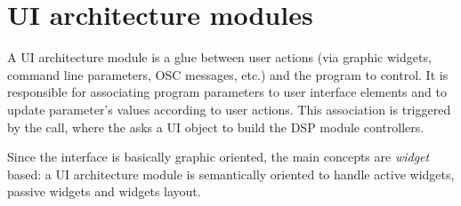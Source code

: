 % 


\section{UI architecture modules} \label{sec:gui}

A UI architecture module is a glue between user actions (via graphic widgets, command line parameters, OSC messages, etc.) and the \faust program to control. 
It is responsible for associating program parameters to user interface elements and to update parameter's values according to user actions. This association is triggered by the  call, where the  asks a UI object to build the DSP module controllers.

Since the interface is basically graphic oriented, the main concepts are \emph{widget} based: a UI architecture module is semantically oriented to handle active widgets, passive widgets and widgets layout.


